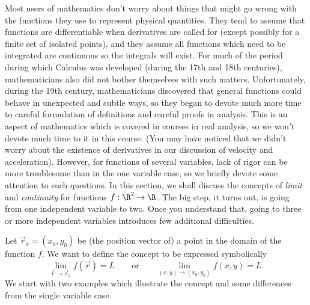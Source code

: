 Most users of mathematics don't worry about things that might
go wrong with the functions they use to represent physical quantities.
They tend to assume that  functions  are differentiable when derivatives
are called for  (except possibly for a finite set of isolated points),
and they assume all functions which need to be integrated are continuous
so the integrals will exist.   For much of the period during which
Calculus was developed (during the 17th and 18th centuries), mathematicians
also did not bother themselves with such matters.   Unfortunately,
during the 19th century, mathematicians discovered that general
functions could behave in  unexpected and subtle ways, so they began to 
devote much more time to careful formulation of definitions and careful
proofs in analysis.   This is an aspect of mathematics which is
covered in courses in real analysis, so we won't devote much time
to it in this course.  (You may have noticed that we didn't worry
about the existence of derivatives in our discussion of
velocity and acceleration).  However, 
for functions of several variables,
lack of rigor can be more troublesome than in
the one variable case,  so we briefly devote some attention to such
questions.
 In this section, we shall discuss the concepts
of \emph{limit} and \emph{continuity} for functions $f:\R^2 \to \R$.
The big step, it turns out, is going from one independent 
variable to two.
Once you understand that, going to three or more
independent variables introduces
few additional difficulties.

Let  $\vec r_0 = ( x_0, y_0 )$ be (the position vector of) a point
in the domain of the function $f$.   We want to define the
concept to be expressed symbolically
\[
    \lim_{\vec r \to \vec r_0} f(\vec r) = L \qquad\text{or}\qquad 
   \lim_{(x,y)\to (x_0,y_0)} f(x,y) = L.
\]
We start with two examples which illustrate the concept and some
differences from the single variable case.

